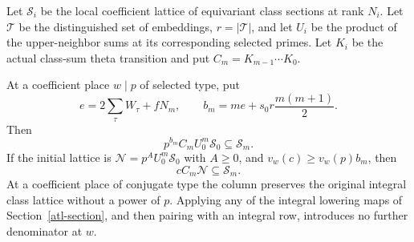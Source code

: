 Let $\mathscr S_i$ be the local coefficient lattice of equivariant
class sections at rank $N_i$. Let $\mathcal T$ be the distinguished
set of embeddings, $r=|\mathcal T|$, and let $U_i$ be the product
of the upper-neighbor sums at its corresponding selected primes.
Let $K_i$ be the actual class-sum theta transition and put
$C_m=K_{m-1}\cdots K_0$.

\begin{theorem}\label{tvc-column}
At a coefficient place $w\mid p$ of selected type, put
\[
 e=2\sum_\tau W_\tau+fN_m,\qquad
 b_m=me+s_0r\frac{m(m+1)}2.
                                                               \tag{TC7}
\]
Then
\[
                  p^{b_m}C_mU_0^m\mathscr S_0
                                          \subseteq\mathscr S_m.
                                                               \tag{TC8}
\]
If the initial lattice is $\mathscr N=p^AU_0^m\mathscr S_0$
with $A\ge0$, and $v_w(c)\ge v_w(p)b_m$, then
\[
                              cC_m\mathscr N\subseteq\mathscr S_m.
                                                               \tag{TC9}
\]
At a coefficient place of conjugate type the column preserves
the original integral class lattice without a power of $p$.
Applying any of the integral lowering maps of
Section~\ref{atl-section}, and then pairing with an integral row,
introduces no further denominator at $w$.
\end{theorem}
